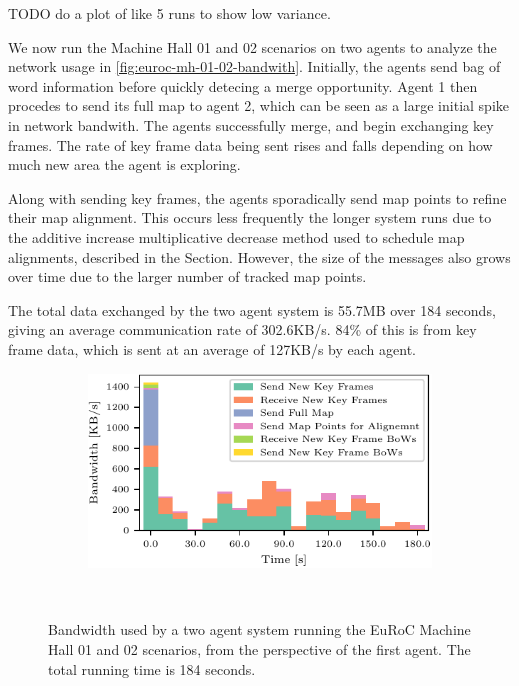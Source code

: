 TODO do a plot of like 5 runs to show low variance.

We now run the Machine Hall 01 and 02 scenarios on two agents to analyze the network usage in \autoref{fig:euroc-mh-01-02-bandwith}. Initially, the agents send bag of word information before quickly detecing a merge opportunity. Agent 1 then procedes to send its full map to agent 2, which can be seen as a large initial spike in network bandwith. The agents successfully merge, and begin exchanging key frames. The rate of key frame data being sent rises and falls depending on how much new area the agent is exploring.

Along with sending key frames, the agents sporadically send map points to refine their map alignment. This occurs less frequently the longer system runs due to the additive increase multiplicative decrease method used to schedule map alignments, described in the  Section. However, the size of the messages also grows over time due to the larger number of tracked map points.

The total data exchanged by the two agent system is 55.7MB over 184 seconds, giving an average communication rate of 302.6KB/s. 84\% of this is from key frame data, which is sent at an average of 127KB/s by each agent.

\begin{figure}[h]
  \centering
  \begin{subfigure}[t]{0.55\textwidth}
    \centering
    \includegraphics[width=\linewidth, valign=b]{figures/euroc_mh_01-02_bandwith.pdf}
  \end{subfigure}%
  ~
  \begin{subfigure}[t]{0.4\textwidth}
    \flushright
  \end{subfigure}%

  \caption{Bandwidth used by a two agent system running the EuRoC Machine Hall 01 and 02 scenarios, from the perspective of the first agent. The total running time is 184 seconds.}
  \label{fig:euroc-mh-01-02-bandwith}
\end{figure}

